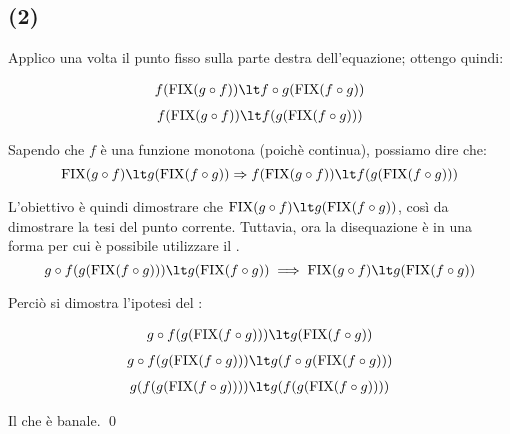 \subsection{(2)}

Applico una volta il punto fisso sulla parte destra dell'equazione; ottengo
quindi:

\begin{align*}
f(\fixp{g \circ f}) \lt f \circ g(\fixp{f \circ g})
\end{align*}
\begin{align*}
f(\fixp{g \circ f}) \lt f(g(\fixp{f \circ g}))
\end{align*}

Sapendo che $f$ è una funzione monotona (poichè continua), possiamo dire che:
$$
\fixp{g \circ f} \lt g(\fixp{f \circ g})
\Rightarrow
f(\fixp{g \circ f}) \lt f(g(\fixp{f \circ g}))
$$

L'obiettivo è quindi dimostrare che $\fixp{g \circ f} \lt g(\fixp{f \circ g})$,
così da dimostrare la tesi del punto corrente. Tuttavia, ora la disequazione è
in una forma per cui è possibile utilizzare il \FPIL.
$$
g \circ f(g(\fixp{f \circ g})) \lt g(\fixp{f \circ g})
\implies
\fixp{g \circ f} \lt g(\fixp{f \circ g})
$$

Perciò si dimostra l'ipotesi del \FPIL:

\begin{align*}
g \circ f(g(\fixp{f \circ g})) \lt g(\fixp{f \circ g})
\end{align*}
\begin{align*}
g \circ f(g(\fixp{f \circ g})) \lt g(f \circ g(\fixp{f \circ g}))
\end{align*}
\begin{align*}
g(f(g(\fixp{f \circ g}))) \lt g(f(g(\fixp{f \circ g})))
\end{align*}

Il che è banale. \qed

\let\lt\undefined
{}
